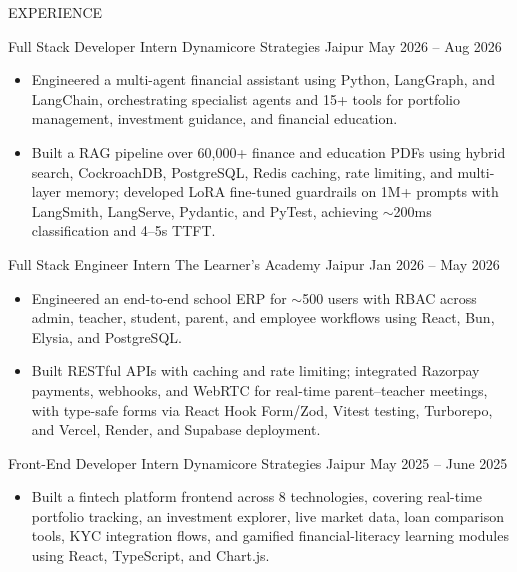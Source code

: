 \documentclass{resume} %
\begin{document}
\begin{rSection}{EXPERIENCE}

\setlength{\parskip}{6pt}
\setlength{\parindent}{2pt}

\experienceHeading
{Full Stack Developer Intern}
{Dynamicore Strategies}
{Jaipur}
{May 2026 -- Aug 2026}

\begin{itemize}
    \itemsep -3pt {}

    \item Engineered a multi-agent financial assistant using Python, LangGraph, and LangChain, orchestrating specialist agents and 15+ tools for portfolio management, investment guidance, and financial education.

    \item Built a RAG pipeline over 60,000+ finance and education PDFs using hybrid search, CockroachDB, PostgreSQL, Redis caching, rate limiting, and multi-layer memory; developed LoRA fine-tuned guardrails on 1M+ prompts with LangSmith, LangServe, Pydantic, and PyTest, achieving $\sim$200ms classification and 4--5s TTFT.

\end{itemize}

\experienceHeading
{Full Stack Engineer Intern}
{The Learner's Academy}
{Jaipur}
{Jan 2026 -- May 2026}

\begin{itemize}
    \itemsep -3pt {}

    \item Engineered an end-to-end school ERP for $\sim$500 users with RBAC across admin, teacher, student, parent, and employee workflows using React, Bun, Elysia, and PostgreSQL.

    \item Built RESTful APIs with caching and rate limiting; integrated Razorpay payments, webhooks, and WebRTC for real-time parent--teacher meetings, with type-safe forms via React Hook Form/Zod, Vitest testing, Turborepo, and Vercel, Render, and Supabase deployment.


\end{itemize}

\experienceHeading
{Front-End Developer Intern}
{Dynamicore Strategies}
{Jaipur}
{May 2025 -- June 2025}

\begin{itemize}
    \itemsep -3pt {}

    \item Built a fintech platform frontend across 8 technologies, covering real-time portfolio tracking, an investment explorer, live market data, loan comparison tools, KYC integration flows, and gamified financial-literacy learning modules using React, TypeScript, and Chart.js.


\end{itemize}
\end{rSection}
\end{document}
